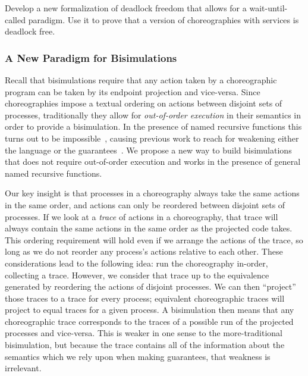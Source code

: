 \begin{goal}
  \label{goal:wait-until-called}
  Develop a new formalization of deadlock freedom that allows for a wait-until-called paradigm.
  Use it to prove that a version of choreographies with services is deadlock free.
\end{goal}

\subsubsection{A New Paradigm for Bisimulations}
\label{sec:new-parad-bisim}

Recall that bisimulations require that any action taken by a choreographic program can be taken by its endpoint projection and vice-versa.
Since choreographies impose a textual ordering on actions between disjoint sets of processes, traditionally they allow for \emph{out-of-order execution} in their semantics in order to provide a bisimulation.
In the presence of named recursive functions this turns out to be impossible~\cite{SamuelsonHC25}, causing previous work to reach for weakening either the language or the guarantees~\cite{HirschG22,CruzFilipeGLMP22,SamuelsonHC25}.
We propose a new way to build bisimulations that does not require out-of-order execution and works in the presence of general named recursive functions.

Our key insight is that processes in a choreography always take the same actions in the same order, and actions can only be reordered between disjoint sets of processes.
If we look at a \emph{trace} of actions in a choreography, that trace will always contain the same actions in the same order as the projected code takes.
This ordering requirement will hold even if we arrange the actions of the trace, so long as we do not reorder any process's actions relative to each other.
These considerations lead to the following idea: run the choreography in-order, collecting a trace.
However, we consider that trace up to the equivalence generated by reordering the actions of disjoint processes.
We can then ``project'' those traces to a trace for every process; equivalent choreographic traces will project to equal traces for a given process.
A bisimulation then means that any choreographic trace corresponds to the traces of a possible run of the projected processes and vice-versa.
This is weaker in one sense to the more-traditional bisimulation, but because the trace contains all of the information about the semantics which we rely upon when making guarantees, that weakness is irrelevant.

